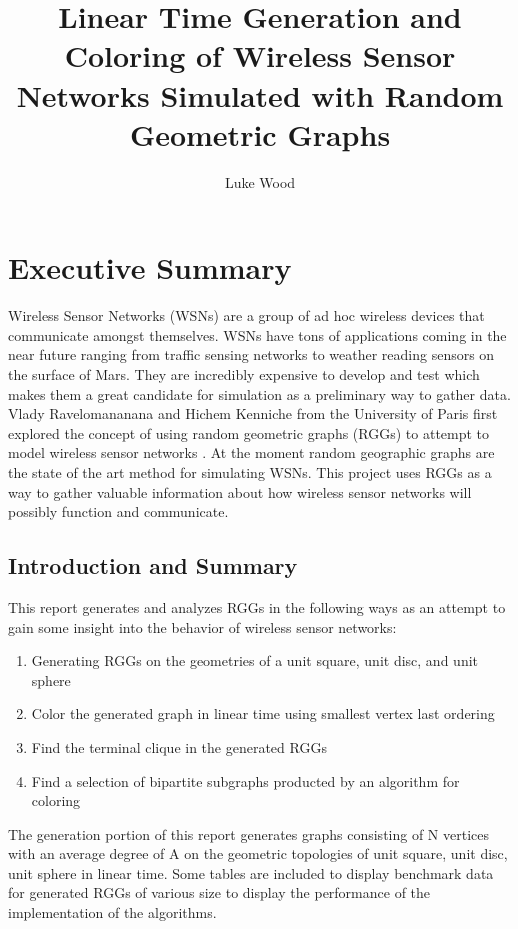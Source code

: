 \documentclass{article}
\begin{document}
  \title{Linear Time Generation and Coloring of Wireless Sensor Networks Simulated with Random Geometric Graphs}
  \author{Luke Wood}
  \maketitle

  \section{Executive Summary}
	Wireless Sensor Networks (WSNs) are a group of ad hoc wireless devices that communicate amongst themselves.
  WSNs have tons of applications coming in the near future ranging from traffic sensing networks to weather reading sensors on the surface of Mars\cite{mahjoub2010employing}.
	They are incredibly expensive to develop and test which makes them a great candidate for simulation as a preliminary way to gather data.
	Vlady Ravelomananana and Hichem Kenniche from the University of Paris first explored the concept of using random geometric graphs (RGGs) to attempt to model wireless sensor networks \cite{kenniche2010random}.
  At the moment random geographic graphs are the state of the art method for simulating WSNs.
	This project uses RGGs as a way to gather valuable information about how wireless sensor networks will possibly function and communicate.

  \subsection{Introduction and Summary}
	This report generates and analyzes RGGs in the following ways as an attempt to gain some insight into the behavior of wireless sensor networks:
	\begin{enumerate}
		\item Generating RGGs on the geometries of a unit square, unit disc, and unit sphere
		\item Color the generated graph in linear time using smallest vertex last ordering\cite{matula1983smallest}
		\item Find the terminal clique in the generated RGGs
		\item Find a selection of bipartite subgraphs producted by an algorithm for coloring
	\end{enumerate}
	The generation portion of this report generates graphs consisting of N vertices with an average degree of A on the geometric topologies of unit square, unit disc, unit sphere in linear time.
	Some tables are included to display benchmark data for generated RGGs of various size to display the performance of the implementation of the algorithms.
\end{document}
